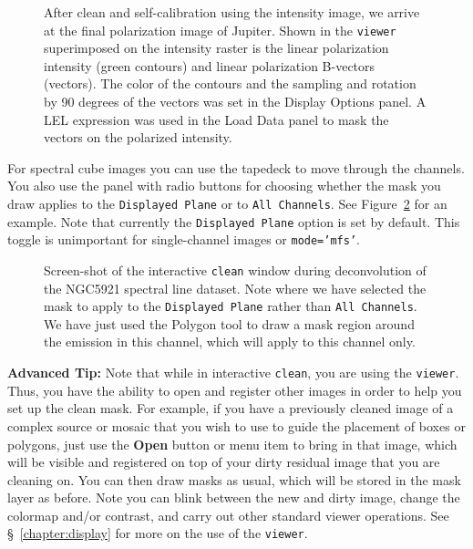 \begin{figure}[h!]
\begin{center}
\caption{\label{fig:clean_polfinal} 
After clean and self-calibration using the intensity image, we 
arrive at the final polarization image of Jupiter.  Shown in
the {\tt viewer} superimposed on the intensity raster is the
linear polarization intensity (green contours) and linear polarization
B-vectors (vectors).  The color of the contours and the sampling and
rotation by 90 degrees of the vectors was set in the Display Options
panel.  A LEL expression was used in the Load Data panel to mask the
vectors on the polarized intensity.}
\hrulefill
\end{center}
\end{figure}

For spectral cube images you can use the tapedeck to move through the
channels.  You also use the panel with radio buttons for choosing
whether the mask you draw applies to the
{\tt Displayed Plane} or to {\tt All Channels}.
See Figure~\ref{fig:clean_n5921_inter} for an example.  Note that
currently the {\tt Displayed Plane} option is set by default.  
This toggle is unimportant for single-channel images or {\tt mode='mfs'}.

\begin{figure}[h!]
\begin{center}
\caption{\label{fig:clean_n5921_inter} Screen-shot of the interactive 
{\tt clean} window during deconvolution of the NGC5921 spectral
line dataset.  Note where we have selected
the mask to apply to the {\tt Displayed Plane} rather than
{\tt All Channels}.  We have just used the
Polygon tool to draw a mask region around the emission in this
channel, which will apply to this channel only. } 
\hrulefill
\end{center}
\end{figure}

{\bf Advanced Tip:} Note that while in interactive {\tt clean}, you
are using the {\tt viewer}. Thus, you have the ability to open and
register other images in order to help you set up the clean mask.
For example, if you have a previously cleaned image of a complex
source or mosaic that you wish to use to guide the placement of boxes
or polygons, just use the {\bf Open} button or menu item to bring in
that image, which will be visible and registered on top of your dirty
residual image that you are cleaning on.  You can then draw masks as
usual, which will be stored in the mask layer as before.  Note you can
blink between the new and dirty image, change the colormap and/or
contrast, and carry out other standard viewer operations.  See
\S~\ref{chapter:display} for more on the use of the {\tt viewer}.

